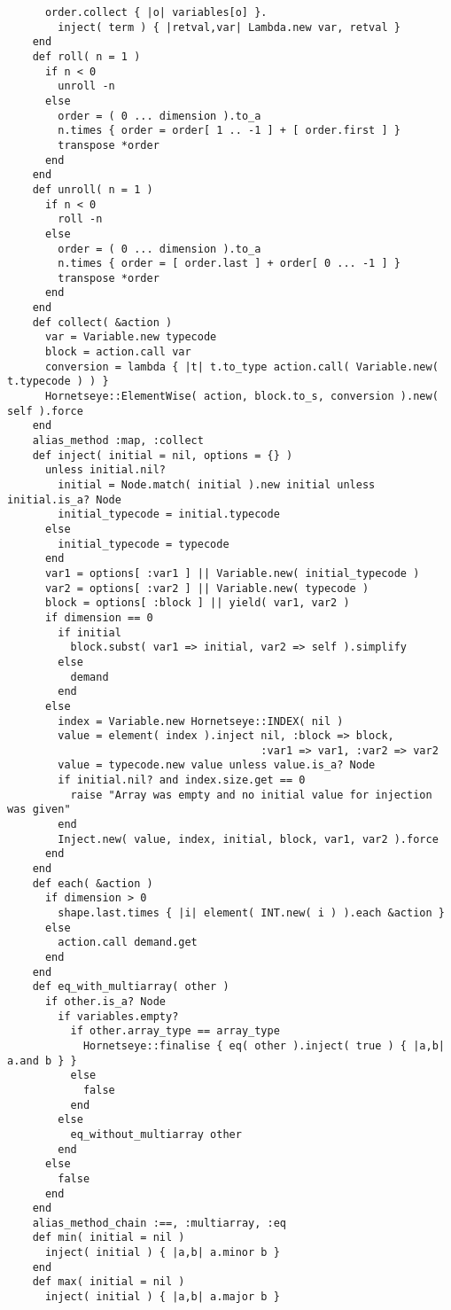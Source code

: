 \begin{lstlisting}
      order.collect { |o| variables[o] }.
        inject( term ) { |retval,var| Lambda.new var, retval }
    end
    def roll( n = 1 )
      if n < 0
        unroll -n
      else
        order = ( 0 ... dimension ).to_a
        n.times { order = order[ 1 .. -1 ] + [ order.first ] }
        transpose *order
      end
    end
    def unroll( n = 1 )
      if n < 0
        roll -n
      else
        order = ( 0 ... dimension ).to_a
        n.times { order = [ order.last ] + order[ 0 ... -1 ] }
        transpose *order
      end
    end
    def collect( &action )
      var = Variable.new typecode
      block = action.call var
      conversion = lambda { |t| t.to_type action.call( Variable.new( t.typecode ) ) }
      Hornetseye::ElementWise( action, block.to_s, conversion ).new( self ).force
    end
    alias_method :map, :collect
    def inject( initial = nil, options = {} )
      unless initial.nil?
        initial = Node.match( initial ).new initial unless initial.is_a? Node
        initial_typecode = initial.typecode
      else
        initial_typecode = typecode
      end
      var1 = options[ :var1 ] || Variable.new( initial_typecode )
      var2 = options[ :var2 ] || Variable.new( typecode )
      block = options[ :block ] || yield( var1, var2 )
      if dimension == 0
        if initial
          block.subst( var1 => initial, var2 => self ).simplify
        else
          demand
        end
      else
        index = Variable.new Hornetseye::INDEX( nil )
        value = element( index ).inject nil, :block => block,
                                        :var1 => var1, :var2 => var2
        value = typecode.new value unless value.is_a? Node
        if initial.nil? and index.size.get == 0
          raise "Array was empty and no initial value for injection was given"
        end
        Inject.new( value, index, initial, block, var1, var2 ).force
      end
    end
    def each( &action )
      if dimension > 0
        shape.last.times { |i| element( INT.new( i ) ).each &action }
      else
        action.call demand.get
      end
    end
    def eq_with_multiarray( other )
      if other.is_a? Node
        if variables.empty?
          if other.array_type == array_type
            Hornetseye::finalise { eq( other ).inject( true ) { |a,b| a.and b } }
          else
            false
          end
        else
          eq_without_multiarray other
        end
      else
        false
      end
    end
    alias_method_chain :==, :multiarray, :eq
    def min( initial = nil )
      inject( initial ) { |a,b| a.minor b }
    end
    def max( initial = nil )
      inject( initial ) { |a,b| a.major b }

\end{lstlisting}
